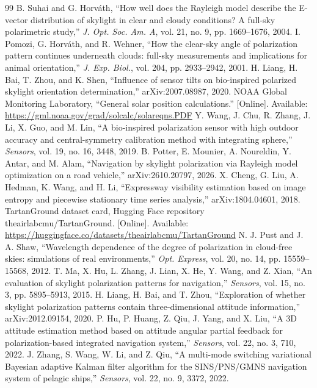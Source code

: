 \documentclass[conference]{IEEEtran}
\begin{document}
\begin{thebibliography}{99}
 B. Suhai and G. Horv\'ath, ``How well does the Rayleigh model describe the E-vector distribution of skylight in clear and cloudy conditions? A full-sky polarimetric study,'' \emph{J. Opt. Soc. Am. A}, vol. 21, no. 9, pp. 1669--1676, 2004.
 I. Pomozi, G. Horv\'ath, and R. Wehner, ``How the clear-sky angle of polarization pattern continues underneath clouds: full-sky measurements and implications for animal orientation,'' \emph{J. Exp. Biol.}, vol. 204, pp. 2933--2942, 2001.
 H. Liang, H. Bai, T. Zhou, and K. Shen, ``Influence of sensor tilts on bio-inspired polarized skylight orientation determination,'' arXiv:2007.08987, 2020.
 NOAA Global Monitoring Laboratory, ``General solar position calculations.'' [Online]. Available: \url{https://gml.noaa.gov/grad/solcalc/solareqns.PDF}
 Y. Wang, J. Chu, R. Zhang, J. Li, X. Guo, and M. Lin, ``A bio-inspired polarization sensor with high outdoor accuracy and central-symmetry calibration method with integrating sphere,'' \emph{Sensors}, vol. 19, no. 16, 3448, 2019.
 B. Potter, E. Mounier, A. Noureldin, Y. Antar, and M. Alam, ``Navigation by skylight polarization via Rayleigh model optimization on a road vehicle,'' arXiv:2610.20797, 2026.
 X. Cheng, G. Liu, A. Hedman, K. Wang, and H. Li, ``Expressway visibility estimation based on image entropy and piecewise stationary time series analysis,'' arXiv:1804.04601, 2018.
 TartanGround dataset card, Hugging Face repository theairlabcmu/TartanGround. [Online]. Available: \url{https://huggingface.co/datasets/theairlabcmu/TartanGround}
 N. J. Pust and J. A. Shaw, ``Wavelength dependence of the degree of polarization in cloud-free skies: simulations of real environments,'' \emph{Opt. Express}, vol. 20, no. 14, pp. 15559--15568, 2012.
 T. Ma, X. Hu, L. Zhang, J. Lian, X. He, Y. Wang, and Z. Xian, ``An evaluation of skylight polarization patterns for navigation,'' \emph{Sensors}, vol. 15, no. 3, pp. 5895--5913, 2015.
 H. Liang, H. Bai, and T. Zhou, ``Exploration of whether skylight polarization patterns contain three-dimensional attitude information,'' arXiv:2012.09154, 2020.
 P. Hu, P. Huang, Z. Qiu, J. Yang, and X. Liu, ``A 3D attitude estimation method based on attitude angular partial feedback for polarization-based integrated navigation system,'' \emph{Sensors}, vol. 22, no. 3, 710, 2022.
 J. Zhang, S. Wang, W. Li, and Z. Qiu, ``A multi-mode switching variational Bayesian adaptive Kalman filter algorithm for the SINS/PNS/GMNS navigation system of pelagic ships,'' \emph{Sensors}, vol. 22, no. 9, 3372, 2022.

\end{thebibliography}
\end{document}

